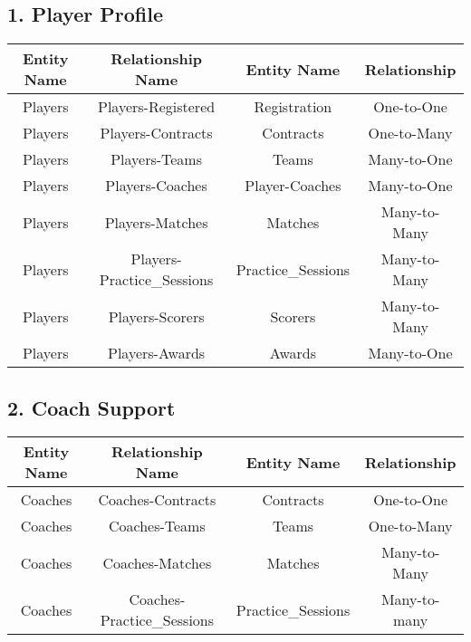 \documentclass[a4paper, 12pt]{article}
\begin{document}
\subsection{1. Player Profile}

\begin{tabular}{|C|C|C|C|}
\hline
    \textbf{Entity Name} &\textbf{Relationship Name} & \textbf{Entity Name} & \textbf{Relationship}\\\hline
        Players & Players-Registered & Registration & One-to-One\\\hline
        Players & Players-Contracts & Contracts & One-to-Many\\\hline
        Players & Players-Teams & Teams & Many-to-One\\\hline
        Players & Players-Coaches & Player-Coaches & Many-to-One\\\hline
        Players & Players-Matches & Matches & Many-to-Many\\\hline
        Players & Players-Practice\_Sessions & Practice\_Sessions & Many-to-Many\\\hline
        Players & Players-Scorers & Scorers & Many-to-Many\\\hline
        Players & Players-Awards & Awards & Many-to-One\\
\hline
\end{tabular}
\newline

\subsection{2. Coach Support}
\begin{tabular}{|C|C|C|C|}
\hline
    \textbf{Entity Name} &\textbf{Relationship Name} & \textbf{Entity Name} & \textbf{Relationship}\\\hline
        Coaches & Coaches-Contracts & Contracts & One-to-One\\\hline
        Coaches & Coaches-Teams & Teams & One-to-Many\\\hline
        Coaches & Coaches-Matches & Matches & Many-to-Many\\\hline
        Coaches & Coaches-Practice\_Sessions & Practice\_Sessions & Many-to-many\\
\hline
\end{tabular}
\newline
\end{document}
